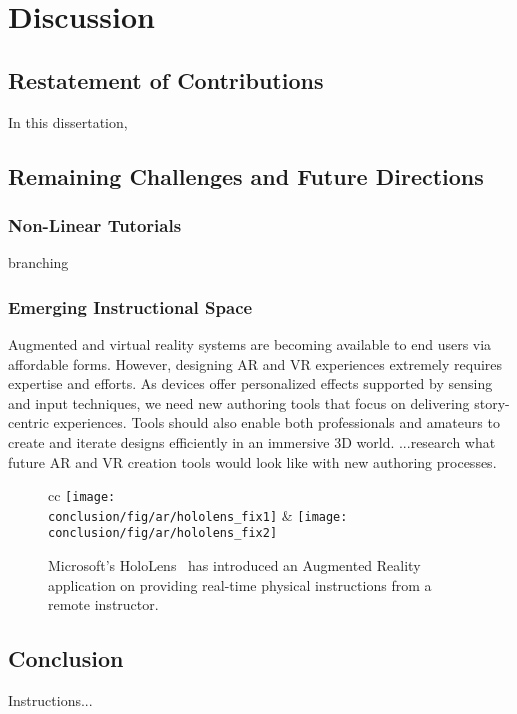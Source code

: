 \chapter{Discussion}
\label{chapter_conclusion}

\section{Restatement of Contributions}
In this dissertation,


\section{Remaining Challenges and Future Directions}

\subsection{Non-Linear Tutorials}
branching

\subsection{Emerging Instructional Space}

Augmented and virtual reality systems are becoming available to end users via affordable forms. However, designing AR and VR experiences extremely requires expertise and efforts. As devices offer personalized effects supported by sensing and input techniques, we need new authoring tools that focus on delivering story-centric experiences. Tools should also enable both professionals and amateurs to create and iterate designs efficiently in an immersive 3D world. ...research what future AR and VR creation tools would look like with new authoring processes.

\begin{figure*}[ht!]
  \centering
\begin{tabular}{cc}
  \texttt{[image: \\conclusion/fig/ar/hololens\_fix1]} &
  \texttt{[image: \\conclusion/fig/ar/hololens\_fix2]} \\
\end{tabular}
\caption{
  Microsoft's HoloLens~\cite{MicrosoftHoloLensSkype} has introduced an Augmented Reality application on providing real-time physical instructions from a remote instructor.
}
\end{figure*}

\section{Conclusion}
Instructions...
